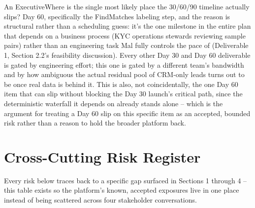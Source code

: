 \documentclass[11pt]{article}
\begin{document}
\begin{stakeholderq}{An Executive}{Where is the single most likely place the 30/60/90 timeline actually slips?}
Day 60, specifically the FindMatches labeling step, and the reason is structural rather than a scheduling guess: it's the one milestone in the entire plan that depends on a business process (KYC operations stewards reviewing sample pairs) rather than an engineering task Mal fully controls the pace of (Deliverable 1, Section 2.2's feasibility discussion). Every other Day 30 and Day 60 deliverable is gated by engineering effort; this one is gated by a different team's bandwidth and by how ambiguous the actual residual pool of CRM-only leads turns out to be once real data is behind it. This is also, not coincidentally, the one Day 60 item that can slip without blocking the Day 30 launch's critical path, since the deterministic waterfall it depends on already stands alone -- which is the argument for treating a Day 60 slip on this specific item as an accepted, bounded risk rather than a reason to hold the broader platform back.
\end{stakeholderq}

\section{Cross-Cutting Risk Register}
\label{sec:risk}
Every risk below traces back to a specific gap surfaced in Sections 1 through 4 -- this table exists so the platform's known, accepted exposures live in one place instead of being scattered across four stakeholder conversations.
\end{document}
